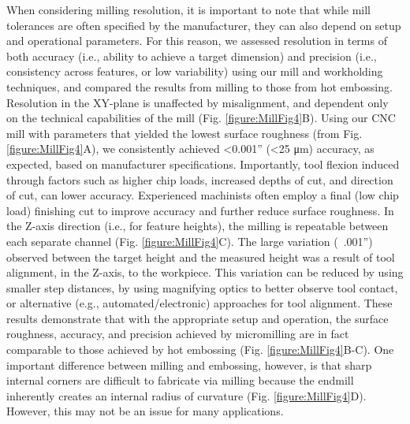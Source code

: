 When considering milling resolution, it is important to note that while mill tolerances are often specified by the manufacturer, they can also depend on setup and operational parameters. For this reason, we assessed resolution in terms of both accuracy (i.e., ability to achieve a target dimension) and precision (i.e., consistency across features, or low variability) using our mill and workholding techniques, and compared the results from milling to those from hot embossing. Resolution in the XY-plane is unaffected by misalignment, and dependent only on the technical capabilities of the mill (Fig. \ref{figure:MillFig4}B). Using our CNC mill with parameters that yielded the lowest surface roughness (from Fig. \ref{figure:MillFig4}A), we consistently achieved <0.001” (<25 μm) accuracy, as expected, based on manufacturer specifications. Importantly, tool flexion induced through factors such as higher chip loads, increased depths of cut, and direction of cut, can lower accuracy. Experienced machinists often employ a final (low chip load) finishing cut to improve accuracy and further reduce surface roughness. In the Z-axis direction (i.e., for feature heights), the milling is repeatable between each separate channel (Fig. \ref{figure:MillFig4}C). The large variation (~.001”) observed between the target height and the measured height was a result of tool alignment, in the Z-axis, to the workpiece.  This variation can be reduced by using smaller step distances, by using magnifying optics to better observe tool contact, or alternative (e.g., automated/electronic) approaches for tool alignment. 
These results demonstrate that with the appropriate setup and operation, the surface roughness, accuracy, and precision achieved by micromilling are in fact comparable to those achieved by hot embossing (Fig. \ref{figure:MillFig4}B-C). One important difference between milling and embossing, however, is that sharp internal corners are difficult to fabricate via milling because the endmill inherently creates an internal radius of curvature (Fig. \ref{figure:MillFig4}D). However, this may not be an issue for many applications.

